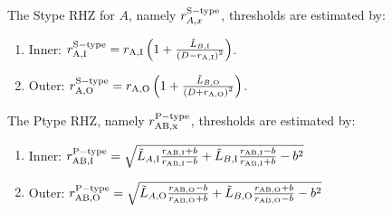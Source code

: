 \documentclass[letterpaper,10pt,english]{sphinxmanual}
\begin{document}
\sphinxAtStartPar
The S\sphinxhyphen{}type RHZ for {\hyperref[\detokenize{celestial_bodies/star:id1}]{}} \(A\), namely \(r_{A, x}^{\rm S-type}\), thresholds are estimated by:
\begin{enumerate}
%
\item {} 
\sphinxAtStartPar
Inner: \(r_{\rm A, I}^{\rm S-type} = r_{\rm A, I} \left(1 + \frac{\tilde L_{B,\rm I}}{\left(D - r_{\rm A, I}\right)^2} \right)\).

\item {} 
\sphinxAtStartPar
Outer: \(r_{\rm A, O}^{\rm S-type} = r_{\rm A, O} \left(1 + \frac{\tilde L_{B,\rm O}}{\left(D + r_{\rm A, O}\right)^2} \right)\).

\end{enumerate}

\sphinxAtStartPar
The P\sphinxhyphen{}type RHZ, namely \(r_{\rm AB, x}^{\rm P-type}\), thresholds are estimated by:
\begin{enumerate}
%
\item {} 
\sphinxAtStartPar
Inner: \(r_{\rm AB, I}^{\rm P-type} = \sqrt{ \tilde L_{A,\rm I} \frac{r_{\rm AB, I} + b}{r_{\rm AB, I} - b} + \tilde L_{B,\rm I} \frac{r_{\rm AB, I} - b}{r_{\rm AB, I} + b} - b^2}\)

\item {} 
\sphinxAtStartPar
Outer: \(r_{\rm AB, O}^{\rm P-type} = \sqrt{ \tilde L_{A,\rm O} \frac{r_{\rm AB, O} - b}{r_{\rm AB, O} + b} + \tilde L_{B,\rm O} \frac{r_{\rm AB, O} + b}{r_{\rm AB, O} - b} - b^2}\)

\end{enumerate}
\end{document}
